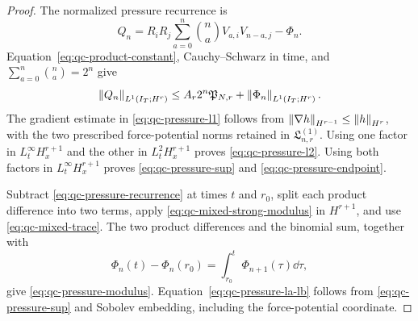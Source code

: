 \begin{proof}
The normalized pressure recurrence is
\begin{equation}
 Q_n=R_iR_j\sum_{a=0}^{n}\binom na V_{a,i}V_{n-a,j}-\Phi_n.
 \label{eq:qc-pressure-recurrence}
\end{equation}
Equation~\eqref{eq:qc-product-constant}, Cauchy--Schwarz in time, and
\(\sum_{a=0}^n\binom na=2^n\) give
\begin{equation}
 \left\lVert Q_n\right\rVert_{L^1(I_T;H^r)}
 \le A_r2^n\mathfrak P_{N,r}
 +\left\lVert \Phi_n\right\rVert_{L^1(I_T;H^r)}.
 \label{eq:qc-pressure-L1-sharp}
\end{equation}
The gradient estimate in \eqref{eq:qc-pressure-l1} follows from
\(\left\lVert \nabla h\right\rVert_{H^{r-1}}\le\left\lVert h\right\rVert_{H^r}\), with the two prescribed
force-potential norms retained in \(\mathfrak L^{(1)}_{n,r}\).
Using one factor in \(L_t^\infty H_x^{r+1}\) and the other in
\(L_t^2H_x^{r+1}\) proves \eqref{eq:qc-pressure-l2}.  Using both factors in
\(L_t^\infty H_x^{r+1}\) proves \eqref{eq:qc-pressure-sup} and
\eqref{eq:qc-pressure-endpoint}.

Subtract \eqref{eq:qc-pressure-recurrence} at times \(t\) and \(r_0\), split
each product difference into two terms, apply
\eqref{eq:qc-mixed-strong-modulus} in \(H^{r+1}\), and use
\eqref{eq:qc-mixed-trace}.  The two product differences and the binomial sum,
together with
\[
 \Phi_n(t)-\Phi_n(r_0)=\int_{r_0}^t\Phi_{n+1}(\tau)\dd\tau,
\]
give \eqref{eq:qc-pressure-modulus}.  Equation~\eqref{eq:qc-pressure-la-lb}
follows from \eqref{eq:qc-pressure-sup} and Sobolev embedding, including the
force-potential coordinate.
\end{proof}

